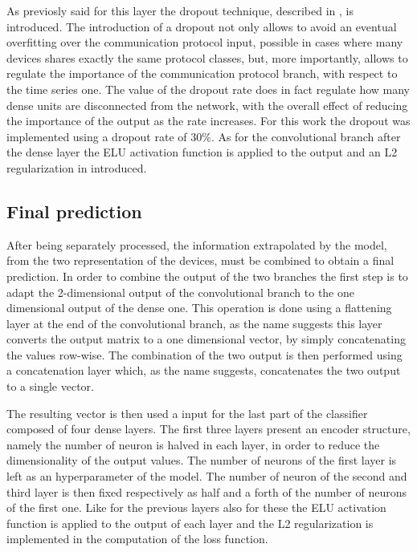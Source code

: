 As previosly said for this layer the dropout technique, described in , is introduced. The introduction of a dropout not only allows to avoid an eventual overfitting over the communication protocol input, possible in cases where many devices shares exactly the same protocol classes, but, more importantly, allows to regulate the importance of the communication protocol branch, with respect to the time series one. The value of the dropout rate does in fact regulate how many dense units are disconnected from the network, with the overall effect of reducing the importance of the output as the rate increases.
For this work the dropout was implemented using a dropout rate of 30\%.
As for the convolutional branch after the dense layer the ELU activation function is applied to the output and an L2 regularization in introduced.

\subsection{Final prediction}

After being separately processed, the information extrapolated by the model, from the two representation of the devices, must be combined to obtain a final prediction. 
In order to combine the output of the two branches the first step is to adapt the 2-dimensional output of the convolutional branch to the one dimensional output of the dense one. This operation is done using a flattening layer at the end of the convolutional branch, as the name suggests this layer converts the output matrix to a one dimensional vector, by simply concatenating the values row-wise.
The combination of the two output is then performed using a concatenation layer which, as the name suggests, concatenates the two output to a single vector.

The resulting vector is then used a input for the last part of the classifier composed of four dense layers. The first three layers present an encoder structure, namely the number of neuron is halved in each layer, in order to reduce the dimensionality of the output values. The number of neurons of the first layer is left as an hyperparameter of the model. The number of neuron of the second and third layer is then fixed respectively as half and a forth of the number of neurons of the first one. Like for the previous layers also for these the ELU activation function is applied to the output of each layer and the L2 regularization is implemented in the computation of the loss function.

